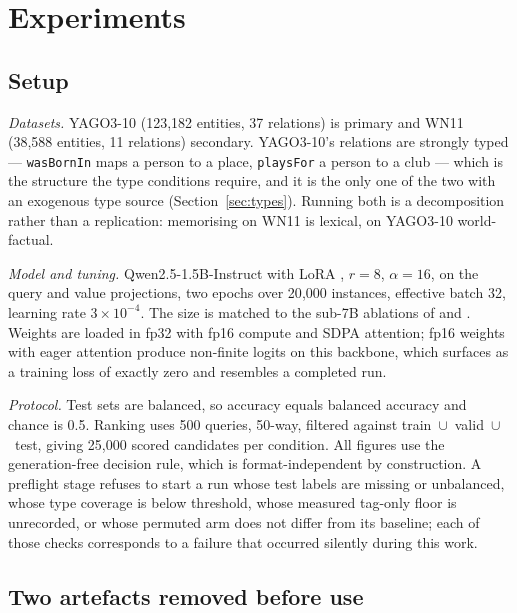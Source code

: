 \documentclass[conference]{IEEEtran}
\begin{document}
\section{Experiments}
\label{sec:setup}

\subsection{Setup}

\emph{Datasets.} YAGO3-10 (123{,}182 entities, 37 relations) is primary and WN11
(38{,}588 entities, 11 relations) secondary. YAGO3-10's relations are strongly
typed --- \texttt{wasBornIn} maps a person to a place, \texttt{playsFor} a
person to a club --- which is the structure the type conditions require, and it
is the only one of the two with an exogenous type source
(Section~\ref{sec:types}). Running both is a decomposition rather than a
replication: memorising on WN11 is lexical, on YAGO3-10 world-factual.

\emph{Model and tuning.} Qwen2.5-1.5B-Instruct \cite{qwen} with LoRA
\cite{lora}, $r=8$,
$\alpha=16$, on the query and value projections, two epochs over 20{,}000
instances, effective batch 32, learning rate $3\times10^{-4}$. The size is
matched to the sub-7B ablations of \cite{cats} and \cite{gskgc}. Weights are
loaded in fp32 with fp16 compute and SDPA attention; fp16 weights with eager
attention produce non-finite logits on this backbone, which surfaces as a
training loss of exactly zero and resembles a completed run.

\emph{Protocol.} Test sets are balanced, so accuracy equals balanced accuracy
and chance is 0.5. Ranking uses 500 queries, 50-way, filtered against
train~$\cup$~valid~$\cup$~test, giving 25{,}000 scored candidates per condition.
All figures use the generation-free decision rule, which is format-independent
by construction. A preflight stage refuses to start a run whose test labels are
missing or unbalanced, whose type coverage is below threshold, whose measured
tag-only floor is unrecorded, or whose permuted arm does not differ from its
baseline; each of those checks corresponds to a failure that occurred silently
during this work.

\subsection{Two artefacts removed before use}
\label{sec:artefacts}
\end{document}
